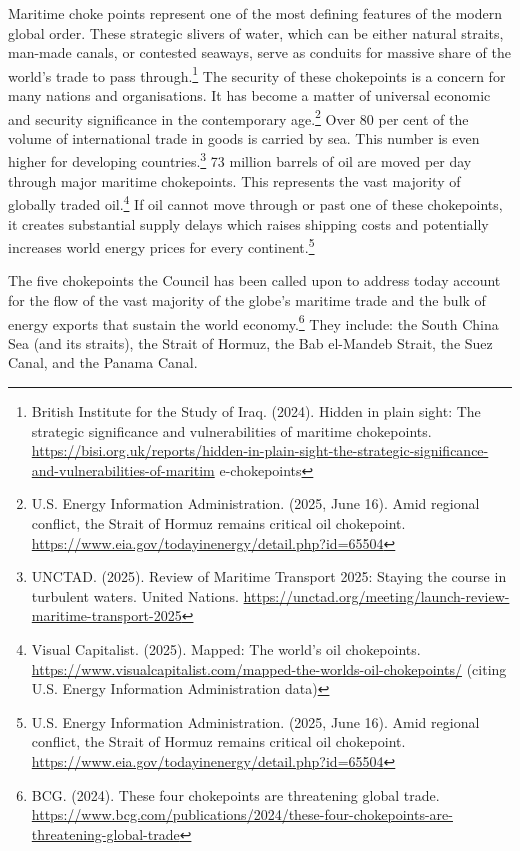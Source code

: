 Maritime choke points represent one of the most defining features of the modern global order. These strategic slivers of water, which can be either natural straits, man-made canals, or contested seaways, serve as conduits for massive share of the world’s trade to pass through.\footnote{British Institute for the Study of Iraq. (2024). Hidden in plain sight: The strategic significance and vulnerabilities of maritime chokepoints. \url{https://bisi.org.uk/reports/hidden-in-plain-sight-the-strategic-significance-and-vulnerabilities-of-maritim} e-chokepoints} The security of these chokepoints is a concern for many nations and organisations. It has become a matter of universal economic and security significance in the contemporary age.\footnote{U.S. Energy Information Administration. (2025, June 16). Amid regional conflict, the Strait of Hormuz remains critical oil chokepoint. \url{https://www.eia.gov/todayinenergy/detail.php?id=65504}} Over 80 per cent of the volume of international trade in goods is carried by sea. This number is even higher for developing countries.\footnote{UNCTAD. (2025). Review of Maritime Transport 2025: Staying the course in turbulent waters. United Nations. \url{https://unctad.org/meeting/launch-review-maritime-transport-2025}} 73 million barrels of oil are moved per day through major maritime chokepoints. This represents the vast majority of globally traded oil.\footnote{Visual Capitalist. (2025). Mapped: The world's oil chokepoints. \url{https://www.visualcapitalist.com/mapped-the-worlds-oil-chokepoints/} (citing U.S. Energy Information Administration data)} If oil cannot move through or past one of these chokepoints, it creates substantial supply delays which raises shipping costs and potentially increases world energy prices for every continent.\footnote{U.S. Energy Information Administration. (2025, June 16). Amid regional conflict, the Strait of Hormuz remains critical oil chokepoint. \url{https://www.eia.gov/todayinenergy/detail.php?id=65504}}

The five chokepoints the Council has been called upon to address today account for the flow of the vast majority of the globe's maritime trade and the bulk of energy exports that sustain the world economy.\footnote{BCG. (2024). These four chokepoints are threatening global trade. \url{https://www.bcg.com/publications/2024/these-four-chokepoints-are-threatening-global-trade}} They include: the South China Sea (and its straits), the Strait of Hormuz, the Bab el-Mandeb Strait, the Suez Canal, and the Panama Canal.

